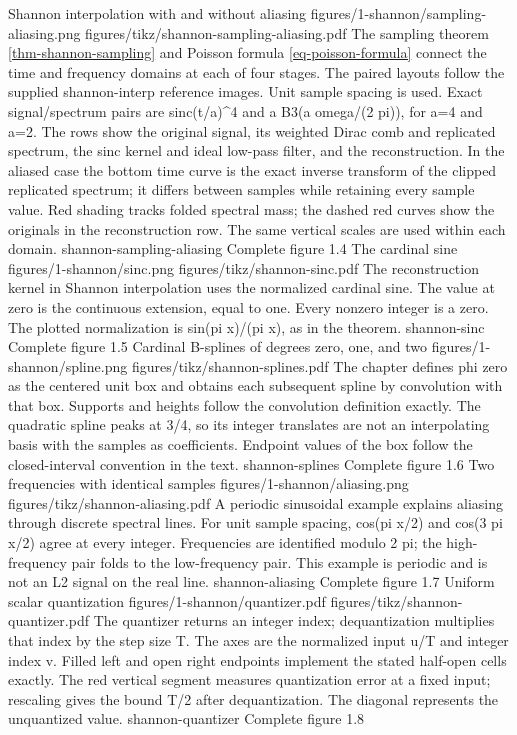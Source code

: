 {Shannon interpolation with and without aliasing}
{figures/1-shannon/sampling-aliasing.png}
{figures/tikz/shannon-sampling-aliasing.pdf}
{The sampling theorem \ref{thm-shannon-sampling} and Poisson formula \eqref{eq-poisson-formula} connect the time and frequency domains at each of four stages.}
{The paired layouts follow the supplied shannon-interp reference images. Unit sample spacing is used. Exact signal/spectrum pairs are sinc(t/a)\textasciicircum{}4 and a B3(a omega/(2 pi)), for a=4 and a=2. The rows show the original signal, its weighted Dirac comb and replicated spectrum, the sinc kernel and ideal low-pass filter, and the reconstruction. In the aliased case the bottom time curve is the exact inverse transform of the clipped replicated spectrum; it differs between samples while retaining every sample value. Red shading tracks folded spectral mass; the dashed red curves show the originals in the reconstruction row. The same vertical scales are used within each domain.}
{shannon-sampling-aliasing}
{Complete figure}
{1.4}
{The cardinal sine}
{figures/1-shannon/sinc.png}
{figures/tikz/shannon-sinc.pdf}
{The reconstruction kernel in Shannon interpolation uses the normalized cardinal sine.}
{The value at zero is the continuous extension, equal to one. Every nonzero integer is a zero. The plotted normalization is sin(pi x)/(pi x), as in the theorem.}
{shannon-sinc}
{Complete figure}
{1.5}
{Cardinal B-splines of degrees zero, one, and two}
{figures/1-shannon/spline.png}
{figures/tikz/shannon-splines.pdf}
{The chapter defines phi zero as the centered unit box and obtains each subsequent spline by convolution with that box.}
{Supports and heights follow the convolution definition exactly. The quadratic spline peaks at 3/4, so its integer translates are not an interpolating basis with the samples as coefficients. Endpoint values of the box follow the closed-interval convention in the text.}
{shannon-splines}
{Complete figure}
{1.6}
{Two frequencies with identical samples}
{figures/1-shannon/aliasing.png}
{figures/tikz/shannon-aliasing.pdf}
{A periodic sinusoidal example explains aliasing through discrete spectral lines.}
{For unit sample spacing, cos(pi x/2) and cos(3 pi x/2) agree at every integer. Frequencies are identified modulo 2 pi; the high-frequency pair folds to the low-frequency pair. This example is periodic and is not an L2 signal on the real line.}
{shannon-aliasing}
{Complete figure}
{1.7}
{Uniform scalar quantization}
{figures/1-shannon/quantizer.pdf}
{figures/tikz/shannon-quantizer.pdf}
{The quantizer returns an integer index; dequantization multiplies that index by the step size T.}
{The axes are the normalized input u/T and integer index v. Filled left and open right endpoints implement the stated half-open cells exactly. The red vertical segment measures quantization error at a fixed input; rescaling gives the bound T/2 after dequantization. The diagonal represents the unquantized value.}
{shannon-quantizer}
{Complete figure}
{1.8}
